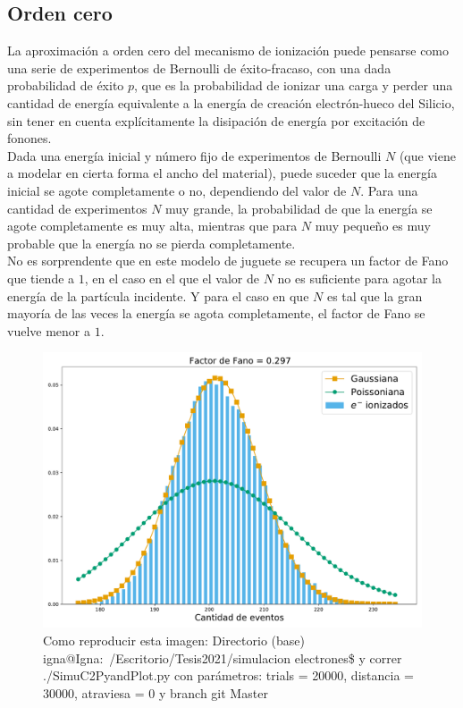 \subsection*{Orden cero}
\noindent La aproximación a orden cero del mecanismo de ionización puede pensarse como una serie de experimentos de Bernoulli de éxito-fracaso, con una dada probabilidad de éxito $p$, que es la probabilidad de ionizar una carga y perder una cantidad de energía equivalente a la energía de creación electrón-hueco del Silicio, sin tener en cuenta explícitamente la disipación de energía por excitación de fonones.\\
\indent Dada una energía inicial y número fijo de experimentos de Bernoulli $N$ (que viene a modelar en cierta forma el ancho del material), puede suceder que la energía inicial se agote completamente o no, dependiendo del valor de $N$. Para una cantidad de experimentos $N$ muy grande, la probabilidad de que la energía se agote completamente es muy alta, mientras que para $N$ muy pequeño es muy probable que la energía no se pierda completamente.\\
\indent No es sorprendente que en este modelo de juguete se recupera un factor de Fano que tiende a $1$, en el caso en el que el valor de $N$ no es suficiente para agotar la energía de la partícula incidente. Y para el caso en que $N$ es tal que la gran mayoría de las veces la energía se agota completamente, el factor de Fano se vuelve menor a $1$.
\begin{figure}[H]
    \centering
    \includegraphics[scale=0.35]{Figs/Orden0_fano0.pdf}
    \caption{\footnotesize{Como reproducir esta imagen: Directorio (base) igna@Igna:~/Escritorio/Tesis2021/simulacion electrones\$ y correr ./SimuC2PyandPlot.py con parámetros: trials = 20000, distancia = 30000, atraviesa = 0 y branch git Master}}
    \label{fig:SimulacionOrden0Fano0}
\end{figure}

